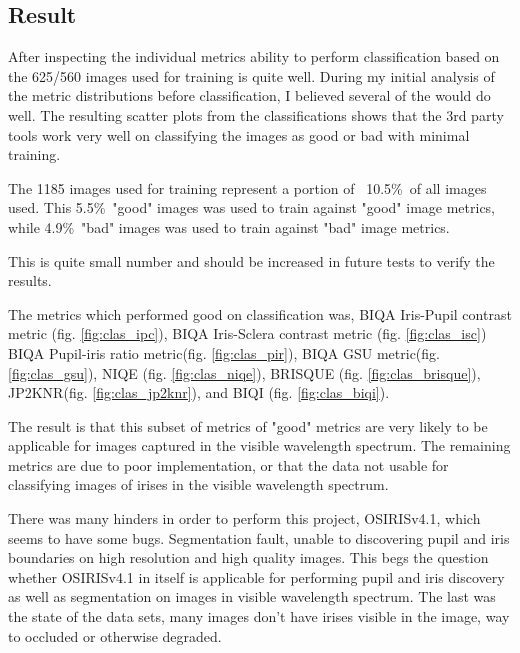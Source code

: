 \subsection{Result}
\label{sec:res}
After inspecting the individual metrics ability to perform classification based
on the 625/560 images used for training is quite well.  During my initial
analysis of the metric distributions before classification, I believed several
of the would do well.  The resulting scatter plots from the classifications
shows that the 3rd party tools work very well on classifying the images as good
or bad with minimal training.

The 1185 images used for training represent a portion of ~10.5\%\ of all images
used. This 5.5\%\ "good" images was used to train against "good" image metrics,
while 4.9\%\ "bad" images was used to train against "bad" image metrics.

This is quite small number and should be increased in future tests to verify the
results.

The metrics which performed good on classification was, BIQA Iris-Pupil contrast
metric (fig. \ref{fig:clas_ipc}), BIQA Iris-Sclera contrast metric (fig.
\ref{fig:clas_isc}) BIQA Pupil-iris ratio metric(fig. \ref{fig:clas_pir}), BIQA
GSU metric(fig. \ref{fig:clas_gsu}), NIQE\cite{niqe} (fig. \ref{fig:clas_niqe}),
BRISQUE\cite{brisque} (fig. \ref{fig:clas_brisque}), JP2KNR\cite{jp2knr}(fig.
\ref{fig:clas_jp2knr}), and BIQI\cite{biqi} (fig. \ref{fig:clas_biqi}).

The result is that this subset of metrics of "good" metrics are very likely to
be applicable for images captured in the visible wavelength spectrum.  The
remaining metrics are due to poor implementation, or that the data not usable
for classifying images of irises in the visible wavelength spectrum.

There was many hinders in order to perform this project,
OSIRISv4.1\cite{osiris}, which seems to have some bugs.  Segmentation
fault, unable to discovering pupil and iris boundaries on high resolution and
high quality images.  This begs the question whether OSIRISv4.1 in itself is
applicable for performing pupil and iris discovery as well as segmentation on
images in visible wavelength spectrum.  The last was the state of the data sets,
many images don't have irises visible in the image, way to occluded or otherwise
degraded.



